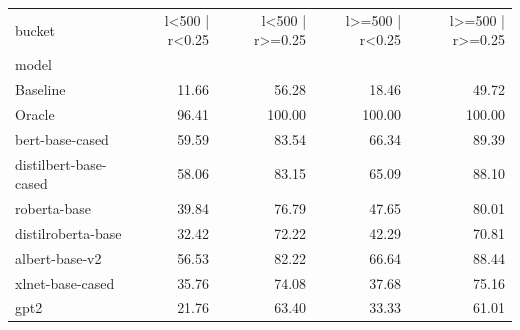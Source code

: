 \begin{tabular}{lrrrr}
\toprule
bucket & l<500 | r<0.25 & l<500 | r>=0.25 & l>=500 | r<0.25 & l>=500 | r>=0.25 \\
model &  &  &  &  \\
\midrule
Baseline & 11.66 & 56.28 & 18.46 & 49.72 \\
Oracle & 96.41 & 100.00 & 100.00 & 100.00 \\
bert-base-cased & 59.59 & 83.54 & 66.34 & 89.39 \\
distilbert-base-cased & 58.06 & 83.15 & 65.09 & 88.10 \\
roberta-base & 39.84 & 76.79 & 47.65 & 80.01 \\
distilroberta-base & 32.42 & 72.22 & 42.29 & 70.81 \\
albert-base-v2 & 56.53 & 82.22 & 66.64 & 88.44 \\
xlnet-base-cased & 35.76 & 74.08 & 37.68 & 75.16 \\
gpt2 & 21.76 & 63.40 & 33.33 & 61.01 \\
\bottomrule
\end{tabular}
